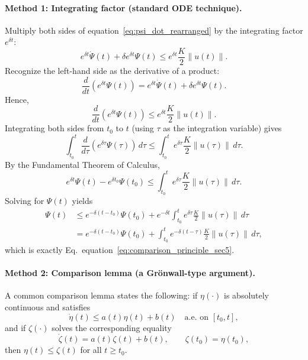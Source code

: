 \documentclass[10pt]{article} %
\def\eqref#1{equation~\ref{#1}}
\theoremstyle{definition}
\begin{document}
\paragraph{Method 1: Integrating factor (standard ODE technique).}
Multiply both sides of \eqref{eq:psi_dot_rearranged} by the integrating factor $e^{\delta t}$:
\begin{equation}
e^{\delta t}\dot{\Psi}(t) + \delta e^{\delta t}\Psi(t) \le e^{\delta t}\frac{K}{2}\|u(t)\|.
\end{equation}
Recognize the left-hand side as the derivative of a product:
\begin{equation}
\frac{d}{dt}\!\left(e^{\delta t}\Psi(t)\right)
= e^{\delta t}\dot{\Psi}(t) + \delta e^{\delta t}\Psi(t).
\end{equation}
Hence,
\begin{equation}
\frac{d}{dt}\!\left(e^{\delta t}\Psi(t)\right) \le e^{\delta t}\frac{K}{2}\|u(t)\|.
\end{equation}
Integrating both sides from $t_0$ to $t$ (using $\tau$ as the integration variable) gives
\begin{equation}
\int_{t_0}^t \frac{d}{d\tau}\!\left(e^{\delta \tau}\Psi(\tau)\right)\,d\tau
\le
\int_{t_0}^t e^{\delta \tau}\frac{K}{2}\|u(\tau)\|\,d\tau.
\end{equation}
By the Fundamental Theorem of Calculus,
\begin{equation}
e^{\delta t}\Psi(t) - e^{\delta t_0}\Psi(t_0)
\le
\int_{t_0}^t e^{\delta \tau}\frac{K}{2}\|u(\tau)\|\,d\tau.
\end{equation}
Solving for $\Psi(t)$ yields
\begin{align}
\Psi(t)
&\le e^{-\delta(t-t_0)}\Psi(t_0)
+ e^{-\delta t}\int_{t_0}^t e^{\delta \tau}\frac{K}{2}\|u(\tau)\|\,d\tau \nonumber\\
&= e^{-\delta(t-t_0)}\Psi(t_0)
+ \int_{t_0}^t e^{-\delta(t-\tau)}\frac{K}{2}\|u(\tau)\|\,d\tau,
\end{align}
which is exactly Eq.~\eqref{eq:comparison_principle_sec5}.

\paragraph{Method 2: Comparison lemma (a Gr\"onwall-type argument).}
A common comparison lemma states the following: if $\eta(\cdot)$ is absolutely continuous and satisfies
\[
\dot{\eta}(t) \le a(t)\eta(t) + b(t)
\quad \text{a.e. on } [t_0,t],
\]
and if $\zeta(\cdot)$ solves the corresponding equality
\[
\dot{\zeta}(t) = a(t)\zeta(t) + b(t),
\qquad \zeta(t_0)=\eta(t_0),
\]
then $\eta(t)\le \zeta(t)$ for all $t\ge t_0$.
\end{document}
